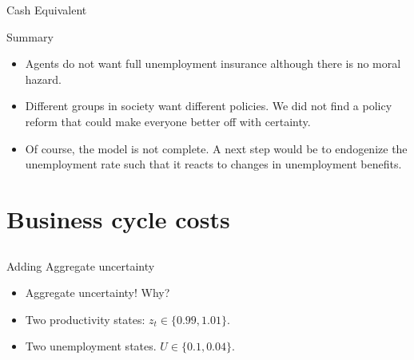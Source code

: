 \documentclass{beamer}
\begin{document}
\begin{frame}{Cash Equivalent}
\end{frame}

\begin{frame}{Summary}
  \begin{itemize}
  \item {
  Agents do not want full unemployment insurance although there is no moral hazard.
  }
  \item {
  Different groups in society want different policies. We did not find a policy reform that could make everyone better off with certainty.
  }
  \item {
  Of course, the model is not complete. A next step would be to endogenize the unemployment rate such that it reacts to changes in unemployment benefits.
  }
  \end{itemize}
\end{frame}


\section{Business cycle costs}
\subsection{}

\begin{frame}{Adding Aggregate uncertainty}
  \begin{itemize}

  \item {
  Aggregate uncertainty! Why?
  }

  \pause

  \item {
   Two productivity states: $z_t \in \{ 0.99, 1.01\}$.
  }

  \item {
  Two unemployment states. $U \in \{0.1, 0.04\}$.
  }



 \end{itemize}

\end{frame}
\end{document}
